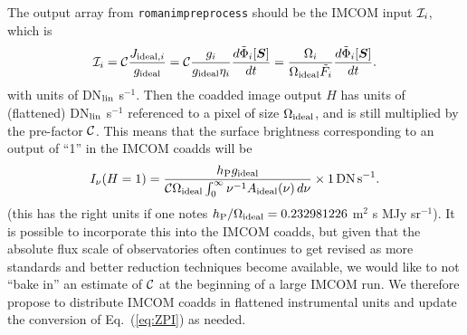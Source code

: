 \documentclass[prd,onecolumn,nofootinbib,nobibnotes]{revtex4}
\begin{document}
The output array from {\tt romanimpreprocess} should be the IMCOM input ${\cal I}_i$, which is
\begin{equation}
{\cal I}_i = {\cal C} \frac{ J_{{\rm ideal},i} }{g_{\rm ideal}} = {\cal C} \frac{g_i}{g_{\rm ideal}\eta_i} \frac{d\tilde\Phi_i[{\boldsymbol S}]}{dt}
= \frac{\Omega_i}{\Omega_{\rm ideal} \tilde F_i} \frac{d\tilde\Phi_i[{\boldsymbol S}]}{dt}.
\end{equation}
with units of DN$_{\rm lin}$ s$^{-1}$. Then the coadded image output $H$ has units of (flattened) DN$_{\rm lin}$ s$^{-1}$ referenced to a pixel of size $\Omega_{\rm ideal}$, and is still multiplied by the pre-factor ${\cal C}$. This means that the surface brightness corresponding to an output of ``1'' in the IMCOM coadds will be
\begin{equation}
I_\nu(H=1) =  \frac{ h_{\rm P} g_{\rm ideal} }{ {\cal C} \Omega_{\rm ideal} \int_0^\infty \nu^{-1} A_{\rm ideal}(\nu)\, d\nu} \times 1\,{\rm DN\,s}^{-1}.
\label{eq:ZPI}
\end{equation}
(this has the right units if one notes $h_{\rm P}/\Omega_{\rm ideal} = 0.232981226$ m$^2$ s MJy sr$^{-1}$).
It is possible to incorporate this into the IMCOM coadds, but given that the absolute flux scale of observatories often continues to get revised as more standards and better reduction techniques become available, we would like to not ``bake in'' an estimate of ${\cal C}$ at the beginning of a large IMCOM run. We therefore propose to distribute IMCOM coadds in flattened instrumental units and update the conversion of Eq.~(\ref{eq:ZPI}) as needed.
\end{document}
